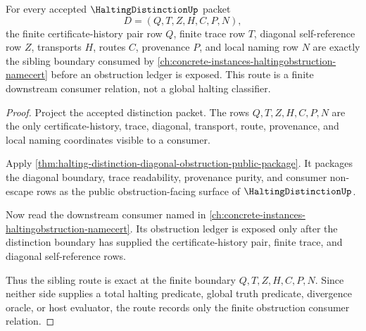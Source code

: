 \begin{theorem}
\label{thm:halting-distinction-obstruction-sibling-route}
For every accepted $\HaltingDistinctionUp$ packet
$$
D=(Q,T,Z,H,C,P,N),
$$
the finite certificate-history pair row $Q$, finite trace row $T$, diagonal self-reference row $Z$, transports $H$, routes $C$, provenance $P$, and local naming row $N$ are exactly the sibling boundary consumed by \autoref{ch:concrete-instances-haltingobstruction-namecert} before an obstruction ledger is exposed. This route is a finite downstream consumer relation, not a global halting classifier.
\end{theorem}
\begin{proof}
Project the accepted distinction packet. The rows $Q,T,Z,H,C,P,N$ are the only certificate-history, trace, diagonal, transport, route, provenance, and local naming coordinates visible to a consumer.

Apply \autoref{thm:halting-distinction-diagonal-obstruction-public-package}. It packages the diagonal boundary, trace readability, provenance purity, and consumer non-escape rows as the public obstruction-facing surface of $\HaltingDistinctionUp$.

Now read the downstream consumer named in \autoref{ch:concrete-instances-haltingobstruction-namecert}. Its obstruction ledger is exposed only after the distinction boundary has supplied the certificate-history pair, finite trace, and diagonal self-reference rows.

Thus the sibling route is exact at the finite boundary $Q,T,Z,H,C,P,N$. Since neither side supplies a total halting predicate, global truth predicate, divergence oracle, or host evaluator, the route records only the finite obstruction consumer relation.
\end{proof}

